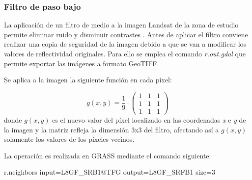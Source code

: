 \subsubsection{Filtro de paso bajo}
La aplicación de un filtro de medio a la imagen Landsat de la zona de estudio permite eliminar ruido y disminuir contrastes \citep{aldalur2002}. Antes de aplicar el filtro conviene realizar una copia de seguridad de la imagen debido a que se van a modificar los valores de reflectividad originales. Para ello se emplea el comando \textit{r.out.gdal} que permite exportar las imágenes a formato GeoTIFF.\Sep

Se aplica a la imagen la siguiente función en cada píxel:

\begin{equation}
	g(x,y)=\frac{1}{9} \cdot \left(\begin{array}{ccc}
								   	1&1&1\\
								   	1&1&1\\
							 	   	1&1&1
								   \end{array}
							 \right)
\end{equation}
donde $g(x,y)$ es el nuevo valor del píxel localizado en las coordenadas \textit{x} e \textit{y} de la imagen y la matriz refleja la dimensión 3x3 del filtro, afectando así a $g(x,y)$ solamente los valores de los píxeles vecinos.\Sep

La operación es realizada en GRASS mediante el comando siguiente:

\begin{center}
\begin{boxedverbatim}
	r.neighbors input=L8GF_SRB1@TFG output=L8GF_SRFB1 size=3
\end{boxedverbatim}
\end{center}